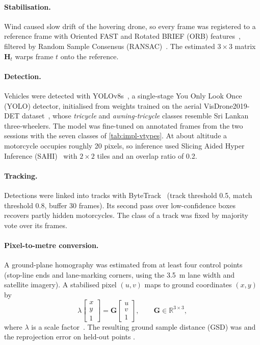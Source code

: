 \paragraph{Stabilisation.} Wind caused slow drift of the hovering drone, so every frame was registered to a reference frame with Oriented FAST and Rotated BRIEF
(ORB) features~\cite{rublee2011orb}, filtered by Random Sample
Consensus (RANSAC)~\cite{fischler1981ransac}.   The estimated $3\times3$ matrix
$\mathbf{H}_t$ warps frame $t$ onto the reference.

\paragraph{Detection.} Vehicles were detected with YOLOv8s~\cite{jocher2023yolov8}, a single-stage
You Only Look Once (YOLO) detector, initialised from weights trained on the aerial VisDrone2019-DET
dataset~\cite{zhu2022visdrone}, whose \emph{tricycle} and \emph{awning-tricycle} classes resemble Sri
Lankan three-wheelers. The model was fine-tuned on  annotated frames from the two sessions
with the seven classes of \cref{tab:impl-vtypes}. At about  altitude a motorcycle occupies
roughly 20 pixels, so inference used Slicing Aided Hyper Inference (SAHI)~\cite{akyon2022sahi} with
$2\times2$ tiles and an overlap ratio of 0.2.

\paragraph{Tracking.} Detections were linked into tracks with ByteTrack~\cite{zhang2022bytetrack}
(track threshold 0.5, match threshold 0.8, buffer 30 frames).  Its second pass over low-confidence boxes recovers partly hidden motorcycles.
The class of a track was fixed by majority vote over its frames.

\paragraph{Pixel-to-metre conversion.} A ground-plane homography was estimated from at least four
control points (stop-line ends and lane-marking corners, using the 3.5~m lane width and satellite
imagery). A stabilised pixel $(u,v)$ maps to ground coordinates $(x,y)$ by
\begin{equation}
  \lambda \begin{bmatrix} x \\ y \\ 1 \end{bmatrix} = \mathbf{G}
  \begin{bmatrix} u \\ v \\ 1 \end{bmatrix}, \qquad \mathbf{G}\in\mathbb{R}^{3\times3},
  \label{eq:impl-homography}
\end{equation}
where $\lambda$ is a scale factor~\cite{hartley2004mvg}. The resulting ground sample distance (GSD)
was  and the reprojection error on held-out points .

